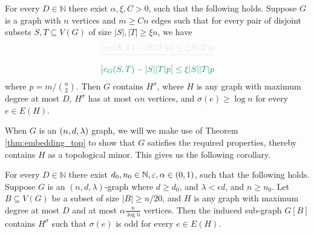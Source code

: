 \documentclass[11pt]{article}
\providecommand{\DIFadd}[1]{\textcolor{shin-ryoku}{#1}}%
\providecommand{\DIFdel}[1]{\textcolor{verylightgray}{\sout{#1}}}                      %
\providecommand{\DIFaddbegin}{} %
\providecommand{\DIFaddend}{} %
\providecommand{\DIFdelbegin}{} %
\providecommand{\DIFdelend}{} %
\begin{document}
\DIFdelend \begin{theorem} \label{thm:embedding_top}
For every $D \in \mathbb{N}$ there exist $\alpha, \xi, C > 0$, such that the following holds. Suppose $G$ is a graph with $n$ vertices and $m \ge Cn$ edges such that for every pair of disjoint subsets $S, T \subseteq V(G)$ of size $|S|, |T| \ge \xi n$, we have
\DIFdelbegin \begin{align*}
  \DIFdel{\bigl| e_{G}(S, T) - |S||T|p \bigr| \le \xi |S||T| p %
}\end{align*}%
\DIFdelend \DIFaddbegin \begin{align*}
  \DIFadd{\bigl| e_{G}(S, T) - |S||T|p \bigr| \le \xi |S||T| p \label{eq:props}
}\end{align*}\DIFaddend 
where $p = m / \binom{n}{2}$. Then $G$ contains $H^{\sigma}$, where $H$ is any graph with maximum degree at most $D$, $H^\sigma$ has at most $\alpha n$ vertices, and $\sigma(e) \ge \log n$ for every $e \in E(H)$.
\end{theorem}

When $G$ is an $(n, d, \lambda)$ graph, we will we make use of Theorem \ref{thm:embedding_top} to show that $G$ satisfies the required properties, thereby contains $H$ as a topological minor.
This gives us the following corollary.
\begin{corollary} \label{cor:embedding_top}
  For every $D \in \mathbb{N}$ there exist $d_0, n_0 \in \mathbb{N}, \varepsilon, \alpha \in (0,1)$, such that the following holds. 
  Suppose $G$ is an $(n,d,\lambda)$-graph where $d \ge d_0$, and $\lambda < \epsilon d$, and $n \ge n_0$. 
  Let $B \subseteq V(G)$ be a subset of size $|B| \ge n/20$, and $H$ is any graph with maximum degree at most $D$ and at most $\alpha \frac{n}{\log n}$ vertices.
Then the induced sub-graph $G[B]$ contains $H^{\sigma}$ such that $\sigma(e)$ is odd for every $e \in E(H)$.
\end{corollary}
\end{document}
